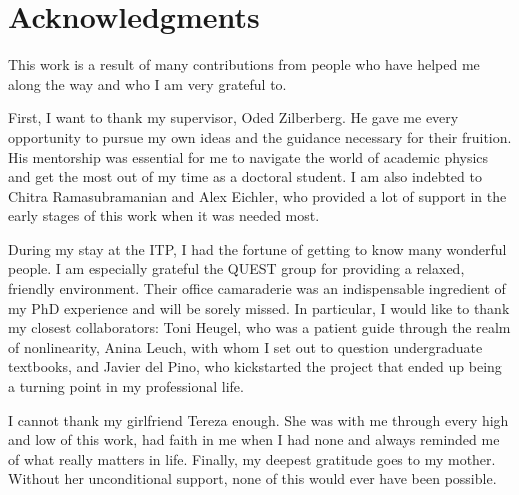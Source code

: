 

\chapter*{Acknowledgments}

This work is a result of many contributions from people who have helped me along the way and who I am very grateful to.

First, I want to thank my supervisor, Oded Zilberberg. He gave me every opportunity to pursue my own ideas and the guidance necessary for their fruition. His mentorship was essential for me to navigate the world of academic physics and get the most out of my time as a doctoral student. I am also indebted to Chitra Ramasubramanian and Alex Eichler, who provided a lot of support in the early stages of this work when it was needed most. 

During my stay at the ITP, I had the fortune of getting to know many wonderful people. I am especially grateful the QUEST group for providing a relaxed, friendly environment. Their office camaraderie was an indispensable ingredient of my PhD experience and will be sorely missed. In particular, I would like to thank my closest collaborators: Toni Heugel, who was a patient guide through the realm of nonlinearity, Anina Leuch, with whom I set out to question undergraduate textbooks, and Javier del Pino, who kickstarted the project that ended up being a turning point in my professional life.

I cannot thank my girlfriend Tereza enough. She was with me through every high and low of this work, had faith in me when I had none and always reminded me of what really matters in life. Finally, my deepest gratitude goes to my mother. Without her unconditional support, none of this would ever have been possible.